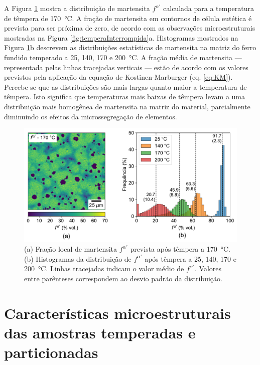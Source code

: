 A Figura \ref{fig:EPMA_fmart} mostra a distribuição de martensita $f^{\alpha'}$ calculada para a temperatura de têmpera de \SI{170}{\degreeCelsius}. A fração de martensita em contornos de célula eutética é prevista para ser próxima de zero, de acordo com as observações microestruturais mostradas na Figura \ref{fig:temperaInterrompida}a. Histogramas mostrados na Figura \ref{fig:EPMA_fmart}b descrevem as distribuições estatísticas de martensita na matriz do ferro fundido temperado a 25, 140, 170 e \SI{200}{\degreeCelsius}. A fração média de martensita --- representada pelas linhas tracejadas verticais --- estão de acordo com os valores previstos pela aplicação da equação de Kostinen-Marburger (eq. \ref{eq:KM}). Percebe-se que as distribuições são mais largas quanto maior a temperatura de têmpera. Isto significa que temperaturas mais baixas de têmpera levam a uma distribuição mais homogênea de martensita na matriz do material, parcialmente diminuindo os efeitos da microssegregação de elementos.

\begin{figure}
  \centering
  \includegraphics[width=.9\textwidth]{img/EPMA/EPMA_fmart.pdf}
  \caption{(a) Fração local de martensita $f^{\alpha'}$ prevista após têmpera a \SI{170}{\degreeCelsius}. (b) Histogramas da distribuição de $f^{\alpha'}$ após têmpera a 25, 140, 170 e \SI{200}{\degreeCelsius}. Linhas tracejadas indicam o valor médio de $f^{\alpha'}$. Valores entre parênteses correspondem ao desvio padrão da distribuição.}
  \label{fig:EPMA_fmart}
\end{figure}


\section{Características microestruturais das amostras temperadas e particionadas}

